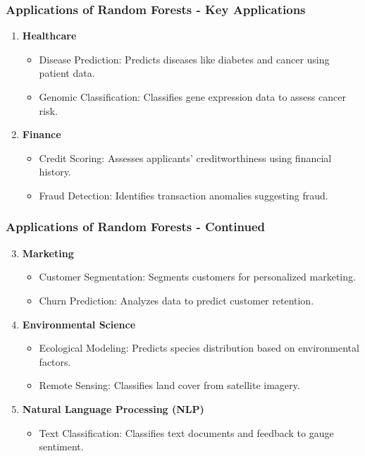 \documentclass[aspectratio=169]{beamer}
\begin{document}
\begin{frame}[fragile]
    \frametitle{Applications of Random Forests - Key Applications}
    \begin{enumerate}
        \item \textbf{Healthcare}
        \begin{itemize}
            \item Disease Prediction: Predicts diseases like diabetes and cancer using patient data.
            \item Genomic Classification: Classifies gene expression data to assess cancer risk.
        \end{itemize}
        
        \item \textbf{Finance}
        \begin{itemize}
            \item Credit Scoring: Assesses applicants' creditworthiness using financial history.
            \item Fraud Detection: Identifies transaction anomalies suggesting fraud.
        \end{itemize}
    \end{enumerate}
\end{frame}

\begin{frame}[fragile]
    \frametitle{Applications of Random Forests - Continued}
    \begin{enumerate}
        \setcounter{enumi}{2} %
        \item \textbf{Marketing}
        \begin{itemize}
            \item Customer Segmentation: Segments customers for personalized marketing.
            \item Churn Prediction: Analyzes data to predict customer retention.
        \end{itemize}

        \item \textbf{Environmental Science}
        \begin{itemize}
            \item Ecological Modeling: Predicts species distribution based on environmental factors.
            \item Remote Sensing: Classifies land cover from satellite imagery.
        \end{itemize}

        \item \textbf{Natural Language Processing (NLP)}
        \begin{itemize}
            \item Text Classification: Classifies text documents and feedback to gauge sentiment.
        \end{itemize}
    \end{enumerate}
\end{frame}
\end{document}
